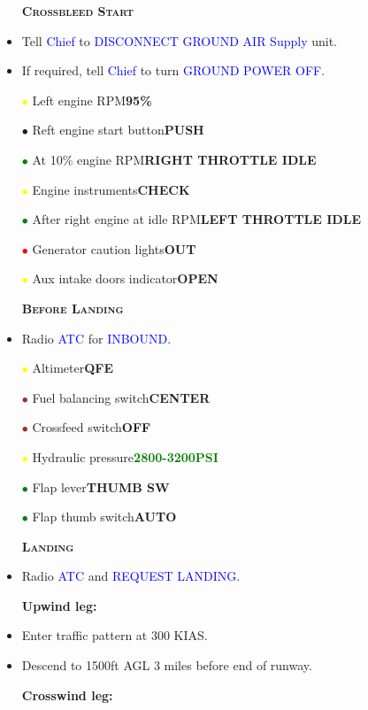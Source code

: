 \documentclass[a4paper,12pt,dvipsnames]{letter}
\newcommand{\radio}[1]{\textcolor{blue}{#1}}
\newcommand{\button}[1]{\textbf{#1}}
\newcommand{\ok}[1]{\textcolor{Green}{\textbf{#1}}}
\newcommand{\myHead}[1]{{\LARGE\textsc{\textbf{#1}}}}
\newcommand{\bi}{\textcolor{ProcessBlue}{$\bullet$\;}}
\newcommand{\ri}{\textcolor{Red}{$\bullet$\;}}
\newcommand{\gi}{\textcolor{Green}{$\bullet$\;}}
\newcommand{\yi}{\textcolor{Yellow}{$\bullet$\;}}
\renewcommand{\ni}{\textcolor{Brown}{$\bullet$\;}}
\newcommand{\tb}[1]{\textbf{#1}}
\begin{document}
{%
\begin{itemize}
 \item[] \myHead{Crossbleed Start}
 \item Tell \radio{Chief} to \radio{DISCONNECT GROUND AIR Supply} unit.
 \item If required, tell \radio{Chief} to turn \radio{GROUND POWER OFF}.
 \item[\yi] Left engine RPM\dotfill\button{95\;\%}
 \item[\bi] Reft engine start button\dotfill\button{PUSH}
 \item[\gi] At 10\;\% engine RPM\dotfill\button{RIGHT THROTTLE IDLE}
 \item[\yi] Engine instruments\dotfill\button{CHECK}
 \item[\gi] After right engine at idle RPM\dotfill\button{LEFT THROTTLE IDLE}
 \item[\ri] Generator caution lights\dotfill\button{OUT}
 \item[\yi] Aux intake doors indicator\dotfill\button{OPEN}
\end{itemize}
\newpage
\begin{itemize}
 \item[] \myHead{Before Landing}
 \item Radio \radio{ATC} for \radio{INBOUND}.
 \item[\yi] Altimeter\dotfill\button{QFE}
 \item[\ni] Fuel balancing switch\dotfill\button{CENTER}
 \item[\ni] Crossfeed switch\dotfill\button{OFF}
 \item[\yi] Hydraulic pressure\dotfill\ok{2800-3200\;PSI}
 \item[\gi] Flap lever\dotfill\button{THUMB SW}
 \item[\gi] Flap thumb switch\dotfill\button{AUTO}
\end{itemize}
\begin{itemize}
 \item[] \myHead{Landing}
 \item Radio \radio{ATC} and \radio{REQUEST LANDING}.
 \item[] \tb{Upwind leg:}
 \item Enter traffic pattern at 300 KIAS.
 \item Descend to 1500\;ft AGL 3 miles before end of runway.
 \item[] \tb{Crosswind leg:}

\end{itemize}}
\end{document}
